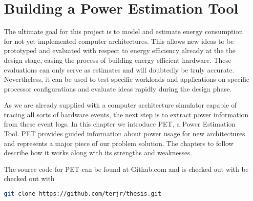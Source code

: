 \chapter{Building a Power Estimation Tool}

The ultimate goal for this project is to model and estimate energy consumption
for not yet implemented computer architectures. This allows new ideas to be
prototyped and evaluated with respect to energy efficiency already at the the
design stage, easing the process of building energy efficient hardware. These
evaluations can only serve as estimates and will doubtedly be truly accurate.
Nevertheless, it can be used to test specific workloads and applications on
specific processor configurations and evaluate ideas rapidly during the design
phase.

As we are already supplied with a computer architecture simulator capable of
tracing all sorts of hardware events, the next step is to extract power
information from these event logs. In this chapter we introduce PET, a Power
Estimation Tool. PET provides guided information about power usage for new
architectures and represents a major piece of our problem solution. The chapters
to follow describe how it works along with its strengths and weaknesses.

\noindent The source code for PET can be found at Github.com and is checked out
with be checked out with
\begin{lstlisting}[language=bash,numbers=none]
git clone https://github.com/terjr/thesis.git
\end{lstlisting}







